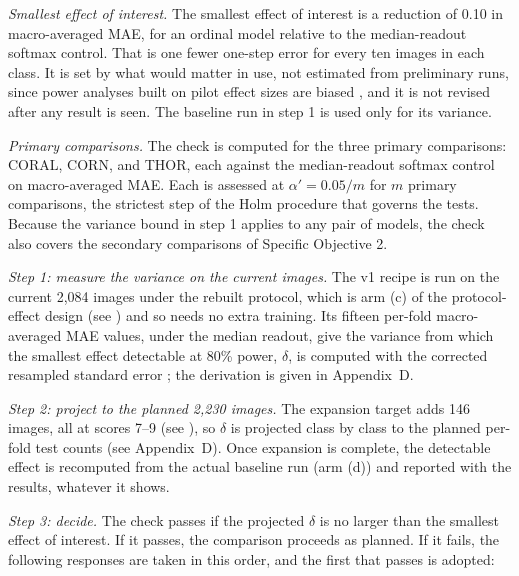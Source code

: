 \documentclass{icsthesis}
\newcommand{\secref}[1]{\textit{\nameref{#1}}}
\begin{document}
\begin{mainmatter}
					\textit{Smallest effect of interest.} The smallest effect of interest is a
					reduction of 0.10 in macro-averaged MAE, for an ordinal model relative to the
					median-readout softmax control. That is one fewer one-step error for every ten
					images in each class. It is set by what would matter in use, not estimated from
					preliminary runs, since power analyses built on pilot effect sizes are biased
					\citep{albers2018}, and it is not revised after any result is seen. The baseline
					run in step 1 is used only for its variance.

					\textit{Primary comparisons.} The check is computed for the three primary
					comparisons: CORAL, CORN, and THOR, each against the median-readout softmax
					control on macro-averaged MAE. Each is assessed at $\alpha' = 0.05/m$ for $m$
					primary comparisons, the strictest step of the Holm procedure that governs the
					tests. Because the variance bound in step 1 applies to any pair of models, the
					check also covers the secondary comparisons of Specific Objective 2.

					\textit{Step 1: measure the variance on the current images.} The v1
					recipe is run on the current 2,084 images under the rebuilt
					protocol, which is arm (c) of the protocol-effect design (see
					\secref{sec:armdesign}) and so needs no extra training. Its fifteen
					per-fold macro-averaged MAE values, under the median readout, give
					the variance from which the smallest effect detectable at 80\%
					power, $\delta$, is computed with the corrected resampled standard
					error \citep{nadeau2003}; the derivation is given in
					Appendix~D.

					\textit{Step 2: project to the planned 2,230 images.} The expansion
					target adds 146 images, all at scores 7--9 (see
					\secref{sec:expansion}), so $\delta$ is projected class by class to
					the planned per-fold test counts (see Appendix~D).
					Once expansion is complete, the detectable effect is recomputed from
					the actual baseline run (arm (d)) and reported with the results,
					whatever it shows.

					\textit{Step 3: decide.} The check passes if the projected $\delta$ is no larger
					than the smallest effect of interest. If it passes, the comparison proceeds as
					planned. If it fails, the following responses are taken in this order, and the
					first that passes is adopted:


\end{mainmatter}
\end{document}
